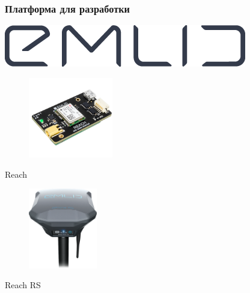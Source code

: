 \documentclass[xetex,t]{beamer}
\begin{document}
%
%
\begin{frame}
  \frametitle{Платформа для разработки}
  
  \begin{minipage}{\textwidth}
    \centering
    \includegraphics[width=.25\textwidth]{../img/emlid-logo}
    \vskip 1.25cm
    \begin{minipage}[c]{.45\textwidth}
      \centering
      \begin{figure}[h]
        \centering
        \includegraphics[height=3.5cm]{../img/reach}
      \end{figure}
      Reach
    \end{minipage}
    \hspace{1em}
    \begin{minipage}[c]{.45\textwidth}
      \centering
      \begin{figure}[h]
        \centering
        \includegraphics[height=3.5cm]{../img/reach-rs}
      \end{figure}
      Reach RS
    \end{minipage}
  \end{minipage}
\end{frame}
\end{document}
